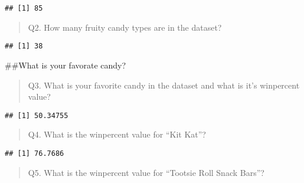 \documentclass[
]{article}
\newenvironment{Shaded}{\begin{snugshade}}{\end{snugshade}}
\newcommand{\DecValTok}[1]{\textcolor[rgb]{0.00,0.00,0.81}{#1}}
\newcommand{\FunctionTok}[1]{\textcolor[rgb]{0.13,0.29,0.53}{\textbf{#1}}}
\newcommand{\NormalTok}[1]{#1}
\newcommand{\OtherTok}[1]{\textcolor[rgb]{0.56,0.35,0.01}{#1}}
\newcommand{\SpecialCharTok}[1]{\textcolor[rgb]{0.81,0.36,0.00}{\textbf{#1}}}
\newcommand{\StringTok}[1]{\textcolor[rgb]{0.31,0.60,0.02}{#1}}
\begin{document}
\begin{verbatim}
## [1] 85
\end{verbatim}

\begin{quote}
Q2. How many fruity candy types are in the dataset?
\end{quote}

\begin{Shaded}
\end{Shaded}

\begin{verbatim}
## [1] 38
\end{verbatim}

\#\#What is your favorate candy?

\begin{quote}
Q3. What is your favorite candy in the dataset and what is it's
winpercent value?
\end{quote}

\begin{Shaded}
\end{Shaded}

\begin{verbatim}
## [1] 50.34755
\end{verbatim}

\begin{quote}
Q4. What is the winpercent value for ``Kit Kat''?
\end{quote}

\begin{Shaded}
\end{Shaded}

\begin{verbatim}
## [1] 76.7686
\end{verbatim}

\begin{quote}
Q5. What is the winpercent value for ``Tootsie Roll Snack Bars''?
\end{quote}
\end{document}
